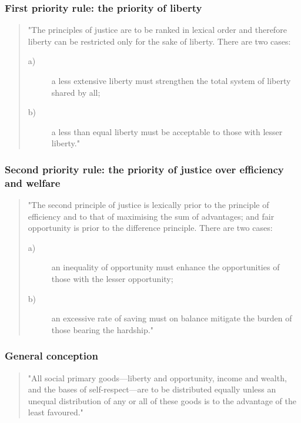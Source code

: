 \documentclass[11pt, oneside]{book}   	%
\begin{document}
\subsubsection{First priority rule: the priority of liberty}

\begin{quote}
"The principles of justice are to be ranked in lexical order and therefore liberty can be restricted only for the sake of liberty.
There are two cases:
\begin{description}
\item[ a)] a less extensive liberty must strengthen the total system of liberty shared by all;
\item[ b)] a less than equal liberty must be acceptable to those with lesser liberty."
\end{description}
\end{quote}

\subsubsection{Second priority rule: the priority of justice over efficiency and welfare}

\begin{quote}
"The second principle of justice is lexically prior to the principle of efficiency and to that of maximising the sum of advantages; and fair opportunity is prior to the difference principle. There are two cases:
\begin{description}
\item[ a)] an inequality of opportunity must enhance the opportunities of those with the lesser opportunity;
\item[ b)] an excessive rate of saving must on balance mitigate the burden of those bearing the hardship."
\end{description}
\end{quote}

\subsubsection{General conception}

\begin{quote}
"All social primary goods---liberty and opportunity, income and wealth, and the bases of self-respect---are to be distributed equally unless an unequal distribution of any or all of these goods is to the advantage of the least favoured."
\end{quote}
\end{document}
